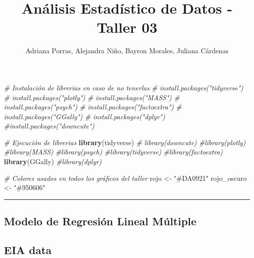 \documentclass[
]{article}
\title{Análisis Estadístico de Datos - Taller 03}
\author{Adriana Porras, Alejandra Niño, Bayron Morales, Juliana
Cárdenas}
\date{}
\newenvironment{Shaded}{\begin{snugshade}}{\end{snugshade}}
\newcommand{\CommentTok}[1]{\textcolor[rgb]{0.56,0.35,0.01}{\textit{#1}}}
\newcommand{\FunctionTok}[1]{\textcolor[rgb]{0.13,0.29,0.53}{\textbf{#1}}}
\newcommand{\NormalTok}[1]{#1}
\newcommand{\OtherTok}[1]{\textcolor[rgb]{0.56,0.35,0.01}{#1}}
\newcommand{\StringTok}[1]{\textcolor[rgb]{0.31,0.60,0.02}{#1}}
\begin{document}
\maketitle

\begin{Shaded}
\begin{Highlighting}[]
\CommentTok{\# Instalación de librerias en caso de no tenerlas}
\CommentTok{\# install.packages("tidyverse")}
\CommentTok{\# install.packages("plotly")}
\CommentTok{\# install.packages("MASS")}
\CommentTok{\# install.packages("psych")}
\CommentTok{\# install.packages("factoextra")}
\CommentTok{\# install.packages("GGally")}
\CommentTok{\# install.packages("dplyr")}
\CommentTok{\#install.packages("downcute")}

\CommentTok{\# Ejecución de librerias}
\FunctionTok{library}\NormalTok{(tidyverse)}
\CommentTok{\# library(downcute)}
\CommentTok{\#library(plotly)}
\CommentTok{\#library(MASS)}
\CommentTok{\#library(psych)}
\CommentTok{\#library(tidyverse)}
\CommentTok{\#library(factoextra)}
\FunctionTok{library}\NormalTok{(GGally)}
\CommentTok{\#library(dplyr)}
\end{Highlighting}
\end{Shaded}

\begin{Shaded}
\begin{Highlighting}[]
\CommentTok{\# Colores usados en todos los gráficos del taller}
\NormalTok{rojo        }\OtherTok{\textless{}{-}} \StringTok{"\#DA0921"}
\NormalTok{rojo\_oscuro }\OtherTok{\textless{}{-}} \StringTok{"\#950606"}
\end{Highlighting}
\end{Shaded}

\begin{center}\rule{0.5\linewidth}{0.5pt}\end{center}

\subsection{Modelo de Regresión Lineal
Múltiple}\label{modelo-de-regresiuxf3n-lineal-muxfaltiple}

\subsection{EIA data}\label{eia-data}
\end{document}
